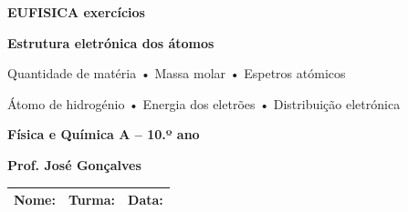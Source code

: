 \documentclass[11pt,a4paper]{article}
\begin{document}
	
	
	\begin{tcolorbox}[
		enhanced,
		colback=eudark,
		colframe=eudark,
		arc=3mm,
		boxrule=0pt,
		left=5mm,
		right=5mm,
		top=5mm,
		bottom=5mm
		]
		
		\begin{center}
			
			{\Huge\bfseries\color{white} EUFISICA exercícios}
			
			\vspace{2mm}
			
			{\Large\bfseries\color{white}
				Estrutura eletrónica dos átomos}
			
			\vspace{2mm}
			
			{\large\color{eulightblue}
				Quantidade de matéria • Massa molar • Espetros atómicos}
			
			{\large\color{eulightblue}
				Átomo de hidrogénio • Energia dos eletrões • Distribuição eletrónica}
			
			\vspace{4mm}
			
			{\large\color{white}\textbf{Física e Química A -- 10.º ano}}
			
			\vspace{2mm}
			
			{\color{white}\textbf{Prof. José Gonçalves}}
			
		\end{center}
		
	\end{tcolorbox}
	
	\vspace{3mm}
	
	\begin{tabularx}{\textwidth}{|X|X|X|}
		\hline
		\textbf{Nome:} &
		\textbf{Turma:} &
		\textbf{Data:} \\[6mm]
		\hline
	\end{tabularx}
	
	\vspace{5mm}
	
	
\end{document}
